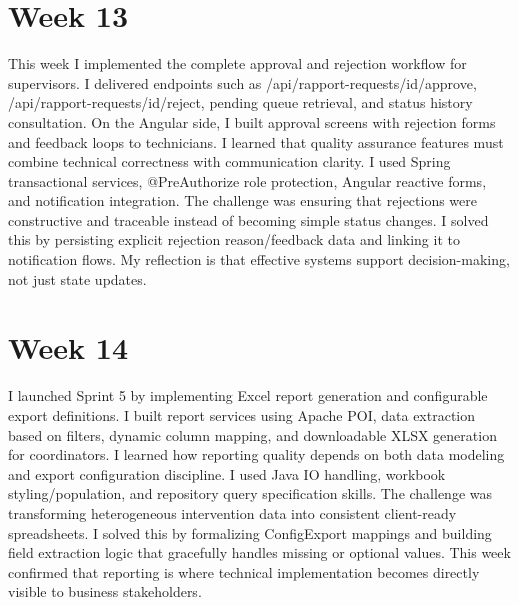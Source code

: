 \section*{Week 13}
This week I implemented the complete approval and rejection workflow for supervisors. I delivered endpoints such as /api/rapport-requests/{id}/approve, /api/rapport-requests/{id}/reject, pending queue retrieval, and status history consultation. On the Angular side, I built approval screens with rejection forms and feedback loops to technicians. I learned that quality assurance features must combine technical correctness with communication clarity. I used Spring transactional services, @PreAuthorize role protection, Angular reactive forms, and notification integration. The challenge was ensuring that rejections were constructive and traceable instead of becoming simple status changes. I solved this by persisting explicit rejection reason/feedback data and linking it to notification flows. My reflection is that effective systems support decision-making, not just state updates.

\section*{Week 14}
I launched Sprint 5 by implementing Excel report generation and configurable export definitions. I built report services using Apache POI, data extraction based on filters, dynamic column mapping, and downloadable XLSX generation for coordinators. I learned how reporting quality depends on both data modeling and export configuration discipline. I used Java IO handling, workbook styling/population, and repository query specification skills. The challenge was transforming heterogeneous intervention data into consistent client-ready spreadsheets. I solved this by formalizing ConfigExport mappings and building field extraction logic that gracefully handles missing or optional values. This week confirmed that reporting is where technical implementation becomes directly visible to business stakeholders.

